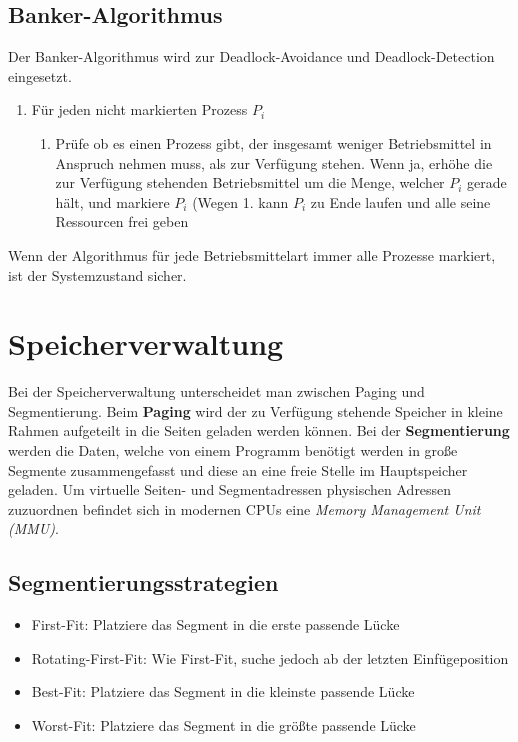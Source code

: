 \documentclass[11pt]{scrartcl}
\begin{document}
\subsection{Banker-Algorithmus}
Der Banker-Algorithmus wird zur Deadlock-Avoidance und Deadlock-Detection eingesetzt.


\begin{enumerate}
  \item{Für jeden nicht markierten Prozess $P_i$}
  \begin{enumerate}
    \item{Prüfe ob es einen Prozess gibt, der insgesamt weniger Betriebsmittel in Anspruch nehmen muss, als zur Verfügung stehen. Wenn ja, erhöhe die zur Verfügung stehenden Betriebsmittel um die Menge, welcher $P_i$ gerade hält, und markiere $P_i$ (Wegen 1. kann $P_i$ zu Ende laufen und alle seine Ressourcen frei geben}
  \end{enumerate}
\end{enumerate}
Wenn der Algorithmus für jede Betriebsmittelart immer alle Prozesse markiert, ist der Systemzustand sicher.

\section{Speicherverwaltung}
Bei der Speicherverwaltung unterscheidet man zwischen Paging und Segmentierung. Beim \textbf{Paging} wird der zu Verfügung stehende Speicher in kleine Rahmen aufgeteilt in die Seiten geladen werden können. Bei der \textbf{Segmentierung} werden die Daten, welche von einem Programm benötigt werden in große Segmente zusammengefasst und diese an eine freie Stelle im Hauptspeicher geladen. Um virtuelle Seiten- und Segmentadressen physischen Adressen zuzuordnen befindet sich in modernen CPUs eine \textit{Memory Management Unit (MMU)}.

\subsection{Segmentierungsstrategien}
\begin{itemize}
	\item{First-Fit: Platziere das Segment in die erste passende Lücke}
    \item{Rotating-First-Fit: Wie First-Fit, suche jedoch ab der letzten Einfügeposition}
    \item{Best-Fit: Platziere das Segment in die kleinste passende Lücke}
    \item{Worst-Fit: Platziere das Segment in die größte passende Lücke}
\end{itemize}
\end{document}
